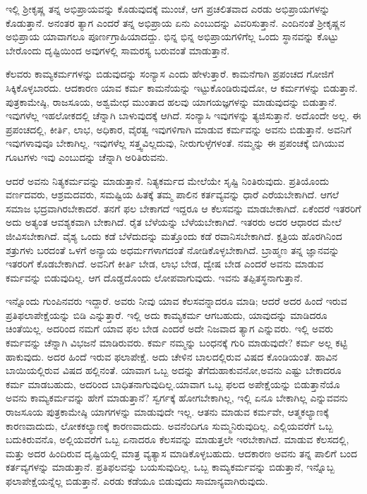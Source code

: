 ಇಲ್ಲಿ ಶ‍್ರೀಕೃಷ್ಣ ತನ್ನ ಅಭಿಪ್ರಾಯವನ್ನು ಕೊಡುವುದಕ್ಕೆ ಮುಂಚೆ, ಆಗ ಪ್ರಚಲಿತವಾದ ಎರಡು ಅಭಿಪ್ರಾಯಗಳನ್ನು ಕೊಡುತ್ತಾನೆ. ಅನಂತರ ತ್ಯಾಗ ಎಂದರೆ ತನ್ನ ಅಭಿಪ್ರಾಯ ಏನು ಎಂಬುದನ್ನು ವಿವರಿಸುತ್ತಾನೆ. ಎಂದಿನಂತೆ ಶ‍್ರೀಕೃಷ್ಣನ ಅಭಿಪ್ರಾಯ ಯಾವಾಗಲೂ ಪೂರ್ಣಗ್ರಾಹಿಯಾದದ್ದು. ಭಿನ್ನ ಭಿನ್ನ ಅಭಿಪ್ರಾಯಗಳಿಗೆಲ್ಲ ಒಂದು ಸ್ಥಾನವನ್ನು ಕೊಟ್ಟು ಬೇರೊಂದು ದೃಷ್ಟಿಯಿಂದ ಅವುಗಳಲ್ಲಿ ಸಾಮರಸ್ಯ ಬರುವಂತೆ ಮಾಡುತ್ತಾನೆ.

ಕೆಲವರು ಕಾಮ್ಯಕರ್ಮಗಳನ್ನು ಬಿಡುವುದನ್ನು ಸಂನ್ಯಾಸ ಎಂದು ಹೇಳುತ್ತಾರೆ. ಕಾಮನೆಗಾಗಿ ಪ್ರಪಂಚದ ಗೋಜಿಗೆ ಸಿಕ್ಕಿಕೊಳ್ಳಬಾರದು. ಆದಕಾರಣ ಯಾವ ಕರ್ಮ ಕಾಮನೆಯನ್ನು ಇಟ್ಟುಕೊಂಡಿರುವುದೋ, ಆ ಕರ್ಮಗಳನ್ನು ಬಿಡುತ್ತಾನೆ. ಪುತ್ರಕಾಮೇಷ್ಠಿ, ರಾಜಸೂಯ, ಅಶ್ವಮೇಧ ಮುಂತಾದ ಹಲವು ಯಾಗಯಜ್ಞಗಳನ್ನು ಮಾಡುವುದನ್ನು ಬಿಡುತ್ತಾನೆ. ಇವುಗಳೆಲ್ಲ ಇಹಲೋಕದಲ್ಲಿ ಚೆನ್ನಾಗಿ ಬಾಳುವುದಕ್ಕೆ ಆಗಿದೆ. ಸಂನ್ಯಾಸಿ ಇವುಗಳನ್ನು ತ್ಯಜಿಸುತ್ತಾನೆ. ಅದೊಂದೇ ಅಲ್ಲ. ಈ ಪ್ರಪಂಚದಲ್ಲಿ, ಕೀರ್ತಿ, ಲಾಭ, ಅಧಿಕಾರ, ವೈರತ್ವ ಇವುಗಳಿಗಾಗಿ ಮಾಡುವ ಕರ್ಮವನ್ನು ಅವನು ಬಿಡುತ್ತಾನೆ. ಅವನಿಗೆ ಇವುಗಳಾವುವೂ ಬೇಕಾಗಿಲ್ಲ. ಇವುಗಳೆಲ್ಲ ಸತ್ತ್ವವಿಲ್ಲದುವು, ನೀರುಗುಳ್ಳೆಗಳಂತೆ. ನಮ್ಮನ್ನು ಈ ಪ್ರಪಂಚಕ್ಕೆ ಬಿಗಿಯುವ ಗೂಟಗಳು ಇವು ಎಂಬುದನ್ನು ಚೆನ್ನಾಗಿ ಅರಿತಿರುವನು.

ಆದರೆ ಅವನು ನಿತ್ಯಕರ್ಮವನ್ನು ಮಾಡುತ್ತಾನೆ. ನಿತ್ಯಕರ್ಮದ ಮೇಲೆಯೇ ಸೃಷ್ಟಿ ನಿಂತಿರುವುದು. ಪ್ರತಿಯೊಂದು ವರ್ಣದವರು, ಆಶ್ರಮದವರು, ಸಮಷ್ಟಿಯ ಹಿತಕ್ಕೆ ತಮ್ಮ ಪಾಲಿನ ಕರ್ತವ್ಯವನ್ನು ಧಾರೆ ಎರೆಯಬೇಕಾಗಿದೆ. ಆಗಲೆ ಸಮಾಜ ಭದ್ರವಾಗಿರಬೇಕಾದರೆ. ತನಗೆ ಫಲ ಬೇಕಾಗದೆ ಇದ್ದರೂ ಆ ಕೆಲಸವನ್ನು ಮಾಡಬೇಕಾಗಿದೆ. ಏಕೆಂದರೆ ಇತರರಿಗೆ ಅದು ಅತ್ಯಂತ ಆವಶ್ಯಕವಾಗಿ ಬೇಕಾಗಿದೆ. ರೈತ ಬೆಳೆಯನ್ನು ಬೆಳೆಯಬೇಕಾಗಿದೆ. ಇತರರು ಅದರ ಆಧಾರದ ಮೇಲೆ ಜೀವಿಸಬೇಕಾಗಿದೆ. ವೈಶ್ಯ ಒಂದು ಕಡೆ ಬೆಳೆದುದನ್ನು ಮತ್ತೊಂದು ಕಡೆ ರವಾನಿಸಬೇಕಾಗಿದೆ. ಕ್ಷತ್ರಿಯ ಹೊರಗಿನಿಂದ ಶತ್ರುಗಳು ಬರದಂತೆ ಒಳಗೆ ಅನ್ಯಾಯ ಅಧರ್ಮಗಳಾಗದಂತೆ ನೋಡಿ\-ಕೊಳ್ಳಬೇಕಾಗಿದೆ. ಬ್ರಾಹ್ಮಣ ತನ್ನ ಜ್ಞಾನವನ್ನು ಇತರರಿಗೆ ಕೊಡಬೇಕಾಗಿದೆ. ಅವನಿಗೆ ಕೀರ್ತಿ ಬೇಡ, ಲಾಭ ಬೇಡ, ದ್ವೇಷ ಬೇಡ ಎಂದರೆ ಅವನು ಮಾಡುವ ಕರ್ಮವನ್ನು ಬಿಡುವುದಿಲ್ಲ. ಆಗ ದೊಡ್ಡದೊಂದು ಲೋಪವಾಗುವುದು. ಇವನು ತಪ್ಪಿತಸ್ಥನಾಗುತ್ತಾನೆ.

ಇನ್ನೊಂದು ಗುಂಪಿನವರು ಇದ್ದಾರೆ. ಅವರು ನೀವು ಯಾವ ಕೆಲಸವನ್ನಾದರೂ ಮಾಡಿ; ಆದರೆ ಅದರ ಹಿಂದೆ ಇರುವ ಪ್ರತಿಫಲಾಪೇಕ್ಷೆಯನ್ನು ಬಿಡಿ ಎನ್ನುತ್ತಾರೆ. ಇಲ್ಲಿ ಅದು ಕಾಮ್ಯಕರ್ಮ ಆಗಬಹುದು, ಯಾವುದನ್ನು ಮಾಡಿದರೂ ಚಿಂತೆಯಿಲ್ಲ. ಅದರಿಂದ ನಮಗೆ ಯಾವ ಫಲ ಬೇಡ ಎಂದರೆ ಅದೇ ನಿಜವಾದ ತ್ಯಾಗ ಎನ್ನುವರು. ಇಲ್ಲಿ ಅವರು ಕರ್ಮವನ್ನು ಚೆನ್ನಾಗಿ ವಿಭಜನೆ ಮಾಡಿರುವರು. ಕರ್ಮ ನಮ್ಮನ್ನು ಬಂಧನಕ್ಕೆ ಗುರಿ ಮಾಡುವುದೇ? ಕರ್ಮ ಅಲ್ಲ ಕಟ್ಟಿ ಹಾಕುವುದು. ಅದರ ಹಿಂದೆ ಇರುವ ಫಲಾಪೇಕ್ಷೆ. ಅದು ಚೇಳಿನ ಬಾಲದಲ್ಲಿರುವ ವಿಷದ ಕೊಂಡಿಯಂತೆ. ಹಾವಿನ ಬಾಯಿಯಲ್ಲಿರುವ ವಿಷದ ಹಲ್ಲಿನಂತೆ. ಯಾವಾಗ ಒಬ್ಬ ಅದನ್ನು ತೆಗೆದುಹಾಕುವನೋ,\break ಅವನು ಎಷ್ಟು ಬೇಕಾದರೂ ಕರ್ಮ ಮಾಡಬಹುದು, ಅದರಿಂದ ಬಾಧಿತನಾಗು\-ವುದಿಲ್ಲ.\break ಯಾವಾಗ ಒಬ್ಬ ಫಲದ ಅಪೇಕ್ಷೆಯನ್ನು ಬಿಡುತ್ತಾನೆಯೊ ಅವನು ಕಾಮ್ಯಕರ್ಮವನ್ನು ಹೇಗೆ ಮಾಡುತ್ತಾನೆ? ಸ್ವರ್ಗಕ್ಕೆ ಹೋಗಬೇಕಾಗಿಲ್ಲ, ಇಲ್ಲಿ ಏನೂ ಬೇಕಾಗಿಲ್ಲ ಎನ್ನುವವನು ರಾಜಸೂಯ ಪುತ್ರಕಾಮೇಷ್ಠಿ ಯಾಗಗಳನ್ನು ಮಾಡುವುದೇ ಇಲ್ಲ. ಆತನು ಮಾಡುವ ಕರ್ಮವೇ, ಆತ್ಮಕಲ್ಯಾಣಕ್ಕೆ ಕಾರಣವಾದುದು, ಲೋಕಕಲ್ಯಾಣಕ್ಕೆ ಕಾರಣವಾದುದು. ಅವನೆಂದಿಗೂ ಸುಮ್ಮನಿರುವುದಿಲ್ಲ. ಎಲ್ಲಿಯವರೆಗೆ ಒಬ್ಬ ಬದುಕಿರುವನೊ, ಅಲ್ಲಿಯವರೆಗೆ ಒಬ್ಬ ಏನಾದರೂ ಕೆಲಸವನ್ನು ಮಾಡುತ್ತಲೇ ಇರಬೇಕಾಗಿದೆ. ಮಾಡುವ ಕೆಲಸದಲ್ಲಿ, ಮತ್ತು ಅದರ ಹಿಂದಿರುವ ದೃಷ್ಟಿಯಲ್ಲಿ ಮಾತ್ರ ವ್ಯತ್ಯಾಸ ಮಾಡಿಕೊಳ್ಳಬಹುದು. ಆದಕಾರಣ ಅವನು ತನ್ನ ಪಾಲಿಗೆ ಬಂದ ಕರ್ತವ್ಯಗಳನ್ನು ಮಾಡುತ್ತಾನೆ. ಪ್ರತಿಫಲವನ್ನು ಬಯಸುವುದಿಲ್ಲ. ಒಬ್ಬ ಕಾಮ್ಯಕರ್ಮವನ್ನು ಬಿಡುತ್ತಾನೆ, ಇನ್ನೊಬ್ಬ ಫಲಾಪೇಕ್ಷೆಯನ್ನೆಲ್ಲ ಬಿಡುತ್ತಾನೆ. ಎರಡು ಕಡೆಯೂ ಬಿಡುವುದು ಸಾಮಾನ್ಯವಾಗಿರುವುದು.

